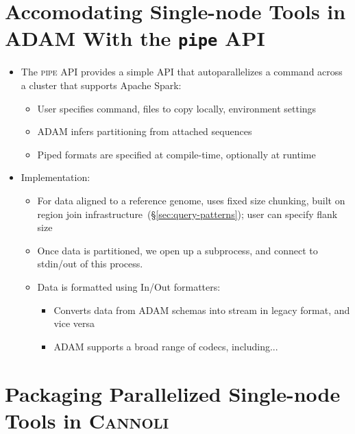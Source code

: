 \documentclass[phd]{ucbthesis}
\begin{document}
\section{Accomodating Single-node Tools in \textsc{ADAM} With the \texttt{pipe} API}
\label{sec:pipe-api}

\begin{itemize}
\item The \textsc{pipe} API provides a simple API that autoparallelizes a command
  across a cluster that supports Apache Spark:
  \begin{itemize}
  \item User specifies command, files to copy locally, environment settings
  \item ADAM infers partitioning from attached sequences
  \item Piped formats are specified at compile-time, optionally at runtime
  \end{itemize}
\item Implementation:
  \begin{itemize}
  \item For data aligned to a reference genome, uses fixed size chunking, built on
    region join infrastructure~(\S\ref{sec:query-patterns}); user can specify flank size
  \item Once data is partitioned, we open up a subprocess, and connect to stdin/out of
    this process.
  \item Data is formatted using In/Out formatters:
    \begin{itemize}
    \item Converts data from ADAM schemas into stream in legacy format, and vice versa
    \item \textsc{ADAM} supports a broad range of codecs, including...
    \end{itemize}
  \end{itemize}
\end{itemize}

\section{Packaging Parallelized Single-node Tools in \textsc{Cannoli}}
\label{sec:parallelizing-in-cannoli}
\end{document}
